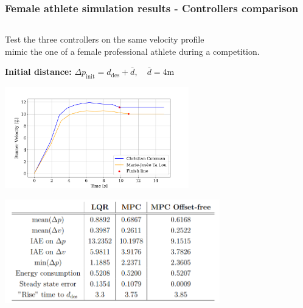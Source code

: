 \documentclass[9pt, aspectratio=169]{beamer}
\begin{document}
\begin{frame}
\frametitle{Female athlete simulation results - Controllers comparison}
\begin{columns}
\begin{column}{0.57\textwidth}
\centering
\begin{block}{}
\centering
Test the three controllers on the same velocity profile \\
mimic the one of a female professional athlete during a competition.
\end{block}
\vspace{-0.2cm}
\begin{block}{}
\textbf{Initial distance:}
\centering
$\Delta p_\text{init} = d_\text{des} + \bar{d}, \quad \bar{d}=4$m
\end{block}
	\begin{center}
  		\includegraphics[width=0.6\textwidth]{Test_Velocities_back} 
	\end{center}
	\begin{center}
  		\includegraphics[width=0.7\textwidth]{Ta_Lou/Table} 
	\end{center}


\end{column}
\end{columns}
\end{frame}
\end{document}
